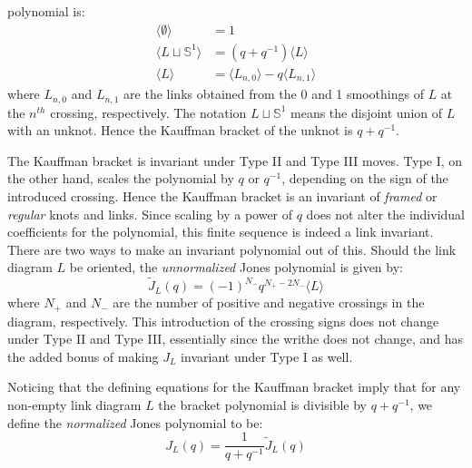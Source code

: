         polynomial is:
        \begin{align}
            \label{eqn:kauffman_bracket}
            \langle\emptyset\rangle&=1\\
            \langle{L\sqcup\mathbb{S}^{1}}\rangle&=(q+q^{-1})\langle{L}\rangle\\
            \langle{L}\rangle&=
                \langle{L_{n,0}}\rangle-q\langle{L_{n,1}}\rangle
        \end{align}
        where $L_{n,0}$ and $L_{n,1}$ are the links obtained from the
        0 and 1 smoothings of $L$ at the $n^{th}$ crossing, respectively. The
        notation $L\sqcup\mathbb{S}^{1}$ means the disjoint union of
        $L$ with an unknot. Hence the Kauffman bracket of the
        unknot is $q+q^{-1}$.
        \par\hfill\par
        The Kauffman bracket is invariant under Type II and Type III moves.
        Type I, on the other hand, scales the polynomial by $q$ or $q^{-1}$,
        depending on the sign of the introduced crossing. Hence the Kauffman
        bracket is an invariant of \textit{framed} or \textit{regular} knots
        and links. Since scaling by a power of $q$ does not alter the individual
        coefficients for the polynomial, this finite sequence is indeed a link
        invariant. There are two ways to make an invariant polynomial out of
        this. Should the link diagram $L$ be oriented, the
        \textit{unnormalized} Jones polynomial is given by:
        \begin{equation}
            \label{eqn:unnormalized_jones}
            \tilde{J}_{L}(q)=(-1)^{N_{-}}q^{N_{+}-2N_{-}}\langle{L}\rangle
        \end{equation}
        where $N_{+}$ and $N_{-}$ are the number of positive and negative
        crossings in the diagram, respectively. This introduction of the
        crossing signs does not change under Type II and Type III, essentially
        since the writhe does not change, and has the added bonus of making
        $J_{L}$ invariant under Type I as well.
        \par\hfill\par
        Noticing that the defining
        equations for the Kauffman bracket imply that for any non-empty link
        diagram $L$ the bracket polynomial is divisible by $q+q^{-1}$, we
        define the \textit{normalized} Jones polynomial to be:
        \begin{equation}
            J_{L}(q)=\frac{1}{q+q^{-1}}\tilde{J}_{L}(q)
        \end{equation}
